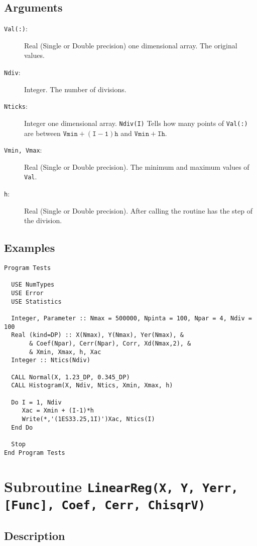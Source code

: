 \subsection{Arguments}

\begin{description}
\item[\texttt{Val(:)}:] Real (Single or Double precision) one
  dimensional array. The original values.
\item[\texttt{Ndiv}: ] Integer. The number of divisions.
\item[\texttt{Nticks}:] Integer one dimensional array. \texttt{Ndiv(I)}
  Tells how many points of \texttt{Val(:)} are between
  $\mathtt{Vmin+(I-1)h}$ and $\mathtt{Vmin+Ih}$.
\item[\texttt{Vmin, Vmax}:] Real (Single or Double precision). The
  minimum and maximum values of \texttt{Val}.
\item[\texttt{h}:] Real (Single or Double precision). After calling
  the routine has the step of the division.
\end{description}

\subsection{Examples}

\begin{verbatim}
Program Tests

  USE NumTypes
  USE Error
  USE Statistics

  Integer, Parameter :: Nmax = 500000, Npinta = 100, Npar = 4, Ndiv = 100
  Real (kind=DP) :: X(Nmax), Y(Nmax), Yer(Nmax), &
       & Coef(Npar), Cerr(Npar), Corr, Xd(Nmax,2), &
       & Xmin, Xmax, h, Xac
  Integer :: Ntics(Ndiv)

  CALL Normal(X, 1.23_DP, 0.345_DP)
  CALL Histogram(X, Ndiv, Ntics, Xmin, Xmax, h)
  
  Do I = 1, Ndiv
     Xac = Xmin + (I-1)*h
     Write(*,'(1ES33.25,1I)')Xac, Ntics(I)
  End Do

  Stop
End Program Tests
\end{verbatim}

\section{Subroutine \texttt{LinearReg(X, Y, Yerr, [Func], Coef, Cerr, ChisqrV)}} 

\subsection{Description}

